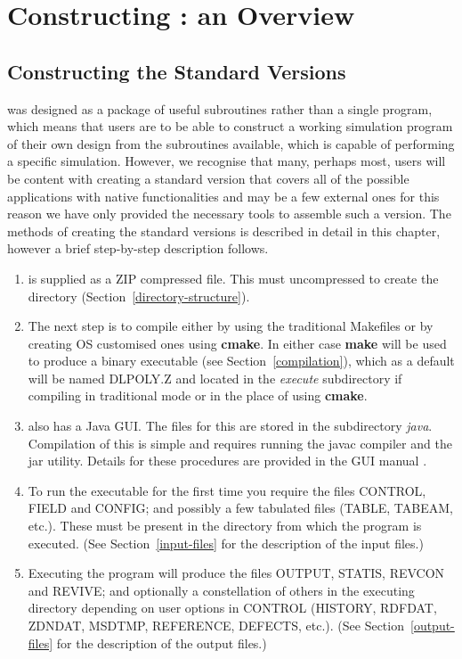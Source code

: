 \section{Constructing \D: an Overview}

\subsection{Constructing the Standard Versions}

\D was designed as a package of useful subroutines rather than a
single program, which means that users are to be able to construct
a working simulation program of their own design from the
subroutines available, which is capable of performing a specific
simulation.  However, we recognise that many, perhaps most, users
will be content with creating a standard version that covers all
of the possible applications with \D native functionalities and may
be a few external ones for this reason we have only provided the
necessary tools to assemble such a version.  The methods of creating
the standard versions is described in detail in this chapter,
however a brief step-by-step description follows.

\begin{enumerate}
\item \D is supplied as a ZIP compressed file.  This must uncompressed
to create the \D directory (Section~\ref{directory-structure}).

\item The next step is to compile \D either by using the traditional
Makefiles or by creating OS customised ones using {\bf cmake}.  In either
case {\bf make} will be used to produce a binary executable (see
Section~\ref{compilation}), which as a default will be named DLPOLY.Z
and located in the {\em execute} subdirectory if compiling in traditional
mode or in the place of using {\bf cmake}.

\item \D also has a Java GUI.  The files for this are stored
in the subdirectory {\em java}.  Compilation of this is simple and
requires running the javac compiler and the jar utility.  Details
for these procedures are provided in the GUI manual \cite{smith-gui}.

\item To run the executable for the first time you require the files
CONTROL, FIELD and CONFIG; and possibly a few tabulated files (TABLE,
TABEAM, etc.).  These must be present in the directory from which the
program is executed.  (See Section~\ref{input-files} for the description
of the input files.)

\item Executing the program will produce the files OUTPUT, STATIS,
REVCON and REVIVE; and optionally a constellation of others in the
executing directory depending on user options in CONTROL (HISTORY,
RDFDAT, ZDNDAT, MSDTMP, REFERENCE, DEFECTS, etc.).
(See Section~\ref{output-files} for the description of the output files.)
\end{enumerate}

